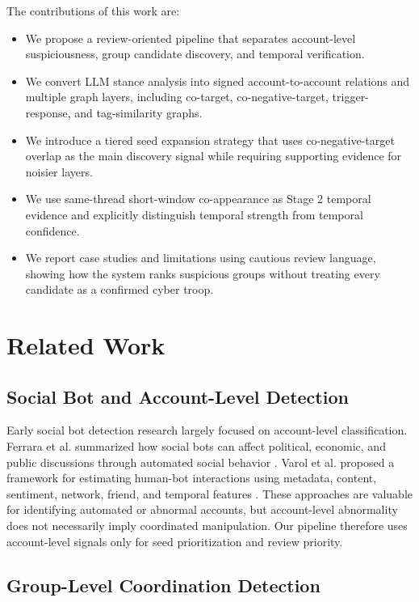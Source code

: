 \documentclass[conference]{IEEEtran}
\begin{document}
The contributions of this work are:
\begin{itemize}
  \item We propose a review-oriented pipeline that separates account-level
  suspiciousness, group candidate discovery, and temporal verification.
  \item We convert LLM stance analysis into signed account-to-account
  relations and multiple graph layers, including co-target, co-negative-target,
  trigger-response, and tag-similarity graphs.
  \item We introduce a tiered seed expansion strategy that uses
  co-negative-target overlap as the main discovery signal while requiring
  supporting evidence for noisier layers.
  \item We use same-thread short-window co-appearance as Stage 2 temporal
  evidence and explicitly distinguish temporal strength from temporal
  confidence.
  \item We report case studies and limitations using cautious review language,
  showing how the system ranks suspicious groups without treating every
  candidate as a confirmed cyber troop.
\end{itemize}

\section{Related Work}

\subsection{Social Bot and Account-Level Detection}

Early social bot detection research largely focused on account-level
classification. Ferrara et al. summarized how social bots can affect political,
economic, and public discussions through automated social behavior
\cite{ferrara2016rise}. Varol et al. proposed a framework for estimating
human-bot interactions using metadata, content, sentiment, network, friend,
and temporal features \cite{varol2017online}. These approaches are valuable
for identifying automated or abnormal accounts, but account-level abnormality
does not necessarily imply coordinated manipulation. Our pipeline therefore
uses account-level signals only for seed prioritization and review priority.

\subsection{Group-Level Coordination Detection}
\end{document}
